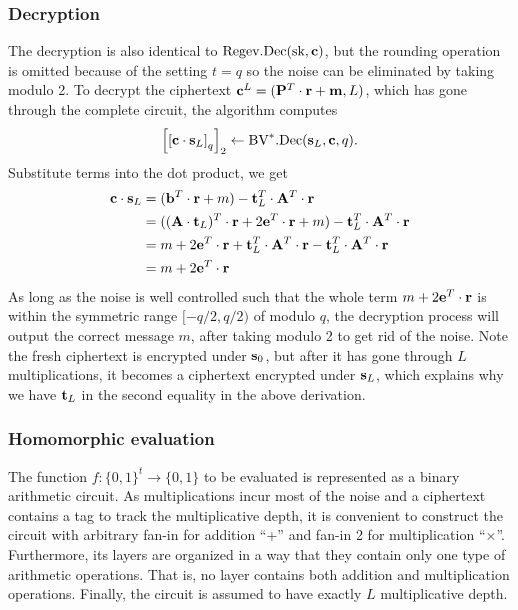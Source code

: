 \documentclass[../main.tex]{subfiles}
\begin{document}
\subsubsection*{Decryption} The decryption is also identical to $\text{Regev}.\text{Dec}(\text{sk},\mathbf{c})$, but the rounding operation is omitted because of the setting $t=q$ so the noise can be eliminated by taking modulo 2. To decrypt the ciphertext $\mathbf{c}^L=(\mathbf{P}^T \cdot \mathbf{r}+ \mathbf{m},L)$, which has gone through the complete circuit, the  algorithm computes %
\begin{align*}%
    \sqbracket{\sqbracket{\vc{c} \cdot \vc{s}_L}_q}_2 \leftarrow \bvv.\dec(\vc{s}_L,\vc{c},q). %
\end{align*}%
Substitute terms into the dot product, we get
\begin{align*}
    \mathbf{c} \cdot \mathbf{s}_L &=(\mathbf{b}^T \cdot \mathbf{r} + m) - \mathbf{t}_L^T \cdot \mathbf{A}^T \cdot \mathbf{r} \\
    &=((\mathbf{A} \cdot \mathbf{t}_L)^T \cdot \mathbf{r}+ 2 \mathbf{e}^T \cdot \mathbf{r} + m) -  \mathbf{t}_L^T \cdot \mathbf{A}^T \cdot \mathbf{r} \\
    &=m+2 \mathbf{e}^T \cdot \mathbf{r} +  \mathbf{t}_L^T \cdot \mathbf{A}^T \cdot \mathbf{r} - \mathbf{t}_L^T \cdot \mathbf{A}^T \cdot \mathbf{r} \\ 
    &= m +2 \mathbf{e}^T \cdot \mathbf{r}
\end{align*}
As long as the noise is well controlled such that the whole term $m+2 \mathbf{e}^T \cdot \mathbf{r}$ is within the symmetric range $[-q/2, q/2)$ of modulo $q$, the decryption process will output the correct message $m$, after taking modulo 2 to get rid of the noise.
Note the fresh ciphertext is encrypted under $\mathbf{s}_0$, but after it has gone through $L$ multiplications, it becomes a ciphertext encrypted under $\mathbf{s}_L$, which explains why we have $\mathbf{t}_L$ in the second equality in the above derivation.


\subsubsection*{Homomorphic evaluation} 
\label{subsubsec:bvHomMul}
The function $f:\{0,1\}^t \rightarrow \{0,1\}$ to be evaluated is represented as a binary arithmetic circuit. As multiplications incur most of the noise and a ciphertext contains a tag to track the multiplicative depth, it is convenient to construct the circuit with arbitrary fan-in for addition ``+'' and fan-in 2 for multiplication ``$\times$''. Furthermore, its layers are organized in a way that they contain only one type of arithmetic operations. That is, no layer contains both addition and multiplication operations. Finally, the circuit is assumed to have exactly $L$ multiplicative depth.
\end{document}
